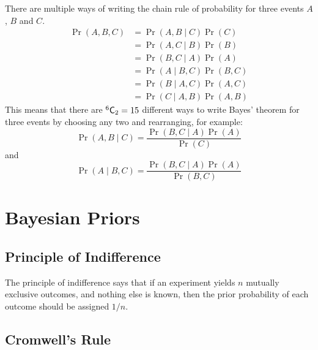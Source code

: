\documentclass[11pt]{report} %
\begin{document}
There are multiple ways of writing the chain rule of probability for three events $A$, $B$ and $C$.
\begin{align}
\operatorname{Pr}\left(A, B, C\right) &= \operatorname{Pr}\left(A, B\middle|C\right)\operatorname{Pr}\left(C\right) \\
&= \operatorname{Pr}\left(A, C\middle|B\right)\operatorname{Pr}\left(B\right) \\
&= \operatorname{Pr}\left(B, C\middle|A\right)\operatorname{Pr}\left(A\right) \\
&= \operatorname{Pr}\left(A\middle|B, C\right)\operatorname{Pr}\left(B, C\right) \\
&= \operatorname{Pr}\left(B\middle|A, C\right)\operatorname{Pr}\left(A, C\right) \\
&= \operatorname{Pr}\left(C\middle|A, B\right)\operatorname{Pr}\left(A, B\right)
\end{align}
This means that there are $\mathstrut^{6}\mathsf{C}_{2} = 15$ different ways to write Bayes' theorem for three events by choosing any two and rearranging, for example:
\begin{equation}
\operatorname{Pr}\left(A, B\middle|C\right) = \dfrac{\operatorname{Pr}\left(B, C\middle|A\right)\operatorname{Pr}\left(A\right)}{\operatorname{Pr}\left(C\right)}
\end{equation}
and
\begin{equation}
\operatorname{Pr}\left(A\middle|B, C\right) = \dfrac{\operatorname{Pr}\left(B, C\middle|A\right)\operatorname{Pr}\left(A\right)}{\operatorname{Pr}\left(B, C\right)}
\end{equation}

\section{Bayesian Priors}

\subsection{Principle of Indifference}

The principle of indifference says that if an experiment yields $n$ mutually exclusive outcomes, and nothing else is known, then the prior probability of each outcome should be assigned $1/n$.

\subsection{Cromwell's Rule}
\end{document}
